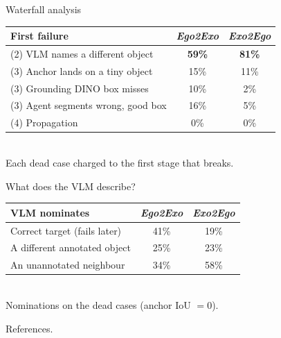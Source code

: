 \documentclass[professionalfonts,aspectratio=169]{beamer}
\begin{document}
\begin{frame}[t]
\begin{center}
{\large Waterfall analysis}
\end{center}
\vfill
    \centering
    \small
    \setlength{\tabcolsep}{4pt}
    \begin{tabular}{lcc}
      \toprule
      First failure & \textit{Ego2Exo} & \textit{Exo2Ego} \\
      \midrule
        (2) VLM names a different object        & \textbf{59\%} & \textbf{81\%} \\
        (3) Anchor lands on a tiny object       & 15\% & 11\% \\
        (3) Grounding DINO box misses           & 10\% & 2\%  \\
        (3) Agent segments wrong, good box      & 16\% & 5\%  \\
        (4) Propagation                         & 0\%  & 0\%  \\
      \bottomrule
    \end{tabular}
    \\[0.6em]
    {\scriptsize Each dead case charged to the first stage that breaks.}
\vfill
\end{frame}

\begin{frame}[t]
\begin{center}
{\large What does the VLM describe?}
\end{center}
\vfill
\centering
    \small
    \begin{tabular}{lcc}
      \toprule
      VLM nominates & \textit{Ego2Exo} & \textit{Exo2Ego} \\
      \midrule
      Correct target (fails later)   & 41\% & 19\% \\
      A different annotated object   & 25\% & 23\% \\
      An unannotated neighbour       & 34\% & 58\% \\
      \bottomrule
    \end{tabular}
    \\[0.6em]
    {\scriptsize Nominations on the dead cases (anchor IoU $=0$).}
\vfill
\end{frame}

\begin{frame}
\begin{center}
    {\Large References.}
\end{center}
\end{frame}
\end{document}
